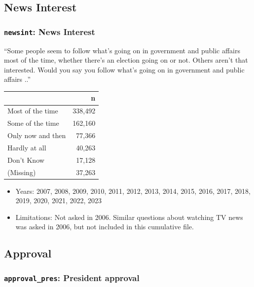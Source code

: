 \documentclass[10pt,article,oneside]{memoir}
\theoremstyle{definition}
\begin{document}
\subsection{News Interest}\label{news-interest}

\subsubsection{\texorpdfstring{\texttt{newsint}: News
Interest}{newsint: News Interest}}\label{newsint-news-interest}

``Some people seem to follow what's going on in government and public
affairs most of the time, whether there's an election going on or not.
Others aren't that interested. Would you say you follow what's going on
in government and public affairs ..''

\begin{table}[H]
\centering
\begin{tabular}[t]{lr}
\toprule
 & n\\
\midrule
Most of the time & 338,492\\
Some of the time & 162,160\\
Only now and then & 77,366\\
Hardly at all & 40,263\\
Don't Know & 17,128\\
(Missing) & 37,263\\
\bottomrule
\end{tabular}
\end{table}

\begin{itemize}
\tightlist
\item
  Years: 2007, 2008, 2009, 2010, 2011, 2012, 2013, 2014, 2015, 2016,
  2017, 2018, 2019, 2020, 2021, 2022, 2023
\item
  Limitations: Not asked in 2006. Similar questions about watching TV
  news was asked in 2006, but not included in this cumulative file.
\end{itemize}

\subsection{Approval}\label{approval}

\subsubsection{\texorpdfstring{\texttt{approval\_pres}: President
approval}{approval\_pres: President approval}}\label{approval_pres-president-approval}
\end{document}
